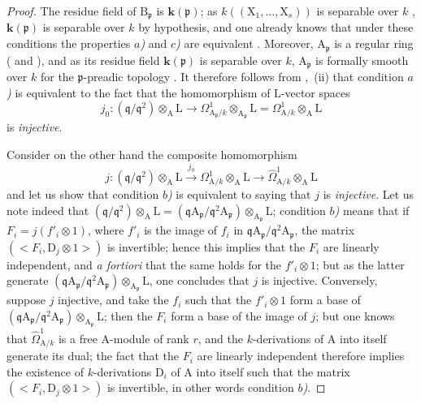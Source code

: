 \begin{proof}
The residue field of $\mathrm{B}_\mathfrak{p}$ is $\boldsymbol{k}(\mathfrak{p})$; as $k((\mathrm{X}_1,\ldots,\mathrm{X}_s))$ is separable over $k$ , $\boldsymbol{k}(\mathfrak{p})$ is separable over $k$ by hypothesis, and one already knows that under these conditions the properties \emph{$a$)} and \emph{$c$)} are equivalent .
Moreover, $\mathrm{A}_\mathfrak{p}$ is a regular ring ( and ), and as its residue field $\boldsymbol{k}(\mathfrak{p})$ is separable over $k$, $\mathrm{A}_\mathfrak{p}$ is formally smooth over $k$ for the $\mathfrak{p}$-preadic topology .
It therefore follows from ,~(ii) that condition \emph{$a$)} is equivalent to the fact that the homomorphism of $\mathrm{L}$-vector spaces
\begin{equation}
\label{0.22.7.2.1}
  j_0:(\mathfrak{q}/\mathfrak{q}^2)\otimes_\mathrm{A}\mathrm{L}
  \longrightarrow \Omega^1_{\mathrm{A}_\mathfrak{p}/k}\otimes_{\mathrm{A}_\mathfrak{p}}\mathrm{L}
  =\Omega^1_{\mathrm{A}/k}\otimes_\mathrm{A}\mathrm{L}
  \tag{22.7.2.1}
\end{equation}
is \emph{injective}.

Consider on the other hand the composite homomorphism
\begin{equation}
\label{0.22.7.2.2}
  j:(\mathfrak{q}/\mathfrak{q}^2)\otimes_\mathrm{A}\mathrm{L}
  \xrightarrow{j_0}\Omega^1_{\mathrm{A}/k}\otimes_\mathrm{A}\mathrm{L}
  \longrightarrow\widehat{\Omega}^1_{\mathrm{A}/k}\otimes_\mathrm{A}\mathrm{L}
  \tag{22.7.2.2}
\end{equation}
and let us show that condition \emph{$b$)} is equivalent to saying that $j$ is \emph{injective}.
Let us note indeed that
$(\mathfrak{q}/\mathfrak{q}^2)\otimes_\mathrm{A}\mathrm{L}
=(\mathfrak{q}\mathrm{A}_\mathfrak{p}/\mathfrak{q}^2\mathrm{A}_\mathfrak{p})\otimes_{\mathrm{A}_\mathfrak{p}}\mathrm{L}$;
condition \emph{$b$)} means that if $F_i=j(f'_i\otimes 1)$, where $f'_i$ is the image of $f_i$ in $\mathfrak{q}\mathrm{A}_\mathfrak{p}/\mathfrak{q}^2\mathrm{A}_\mathfrak{p}$, the matrix $(\mathopen{<}F_i,\mathrm{D}_j\otimes 1\mathclose{>})$ is invertible; hence this implies that the $F_i$ are linearly independent, and \emph{a fortiori} that the same holds for the $f'_i\otimes 1$; but as the latter generate $(\mathfrak{q}\mathrm{A}_\mathfrak{p}/\mathfrak{q}^2\mathrm{A}_\mathfrak{p})\otimes_{\mathrm{A}_\mathfrak{p}}\mathrm{L}$, one concludes that $j$ is injective.
Conversely, suppose $j$ injective, and take the $f_i$ such that the $f'_i\otimes 1$ form
a base of $(\mathfrak{q}\mathrm{A}_\mathfrak{p}/\mathfrak{q}^2\mathrm{A}_\mathfrak{p})\otimes_{\mathrm{A}_\mathfrak{p}}\mathrm{L}$; then the $F_i$ form a base of the image of $j$; but one knows  that $\widehat{\Omega}^1_{\mathrm{A}/k}$ is a free $\mathrm{A}$-module of rank $r$, and the $k$-derivations of $\mathrm{A}$ into itself generate its dual; the fact that the $F_i$ are linearly independent therefore implies the existence of $k$-derivations $\mathrm{D}_i$ of $\mathrm{A}$ into itself such that the matrix $(\mathopen{<}F_i,\mathrm{D}_j\otimes 1\mathclose{>})$ is invertible, in other words condition \emph{$b$)}.


\end{proof}
